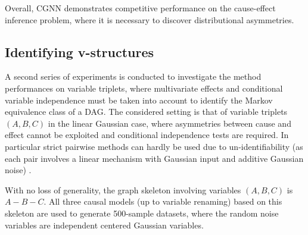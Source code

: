 \documentclass[a4paper, 11pt]{article}
\begin{document}
Overall, CGNN demonstrates competitive performance on the cause-effect inference problem, where it is necessary to discover distributional asymmetries.

\subsection{Identifying v-structures }

A second series of experiments is conducted to investigate the method performances on variable triplets, where  multivariate effects and conditional variable independence must be taken into account to identify the Markov equivalence class of a DAG. 
The considered setting is that of variable triplets $(A, B, C)$ in the linear Gaussian case, where asymmetries between cause and effect cannot be exploited \citep{shimizu2006linear} and conditional independence tests are required. In particular strict pairwise methods can hardly be used due to un-identifiability (as each pair involves a linear mechanism with Gaussian input and additive Gaussian noise)  \citep{hoyer2009nonlinear}.


With no loss of generality, the graph skeleton involving variables $(A, B, C)$ is $A-B-C$. All three causal models (up to variable renaming) based on this skeleton are used to generate 500-sample datasets, where the random noise variables are independent centered Gaussian variables. 
\end{document}
